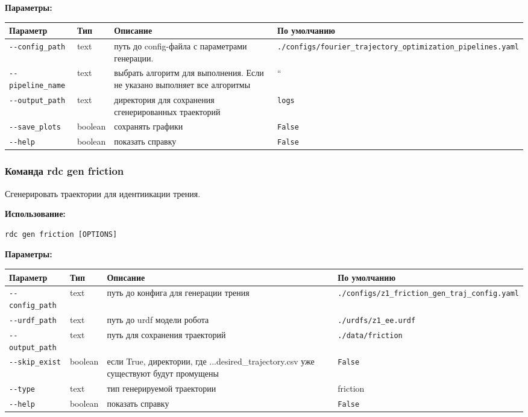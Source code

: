 \textbf{Параметры:}
\begin{center}
\fontsize{10pt}{10pt}\selectfont
\begin{longtable}[]{p{5cm}|p{2cm}|p{3.5cm}|p{5cm}}
    \hline
\toprule()
Параметр & Тип & Описание & По умолчанию \\
\hline
\midrule()
\endhead
\texttt{-\/-config\_path} & text & путь до config-файла с параметрами генерации. &
\texttt{./configs/fourier\_trajectory\_optimization\_pipelines.yaml} \\
\hline
\texttt{-\/-pipeline\_name} & text & выбрать алгоритм для выполнения. Если не указано выполняет все алгоритмы & `` \\
\hline
\texttt{-\/-output\_path} & text & директория для сохранения сгенерированных траекторий & \texttt{logs} \\
\hline
\texttt{-\/-save\_plots} & boolean & сохранять графики &
\texttt{False} \\
\hline
\texttt{-\/-help} & boolean & показать справку &
\texttt{False} \\
\hline
\bottomrule()
\hline
\end{longtable}
\end{center}

\hypertarget{rdc-gen-friction}{%
\subsubsection{ Команда rdc gen friction}\label{rdc-gen-friction}}

Сгенерировать траектории для идентиикации трения.

\textbf{Использование:}
\begin{lstlisting}[language=python, numbers=none, frame=single]
rdc gen friction [OPTIONS]
\end{lstlisting}

\textbf{Параметры:}
\begin{center}
\fontsize{10pt}{10pt}\selectfont
\begin{longtable}[]{p{5cm}|p{2cm}|p{3.5cm}|p{5cm}}
    \hline
\toprule()
Параметр & Тип & Описание & По умолчанию \\
\hline
\midrule()
\endhead
\texttt{-\/-config\_path} & text & путь до конфига для генерации трения &
\texttt{./configs/z1\_friction\_gen\_traj\_config.yaml} \\
\hline
\texttt{-\/-urdf\_path} & text & путь до urdf модели робота&
\texttt{./urdfs/z1\_ee.urdf} \\
\hline
\texttt{-\/-output\_path} & text & путь для сохранения траекторий &
\texttt{./data/friction} \\
\hline
\texttt{-\/-skip\_exist} & boolean & если True, директории, где ...desired\_trajectory.csv уже существуют будут промущены & \texttt{False} \\
\hline
\texttt{-\/-type} & text & тип генерируемой траектории & friction \\
\hline
\texttt{-\/-help} & boolean & показать справку &
\texttt{False} \\
\bottomrule()
\hline
\end{longtable}
\end{center}


